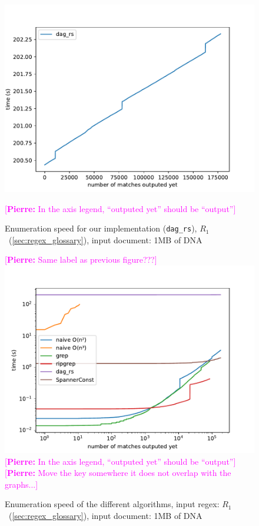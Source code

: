 \documentclass[12px]{article}
\theoremstyle{definition}
\newcommand{\pierre}[1]{\textcolor{magenta}{[\textbf{Pierre:} #1]}}
\begin{document}
      \begin{figure}%
        \caption{
          Enumeration speed for our implementation (\texttt{dag\_rs}),
          $R_1$~(\ref{sec:regex_glossary}), input document: 1MB of DNA }
        \label{fig:bench}
        \center\includegraphics[width=5in]{figures/bench_enum_only}

        \pierre{In the axis legend, ``outputed yet'' should be
        ``output''}
      \end{figure}

      \begin{figure}%
        \caption{
          Enumeration speed of the different algorithms, input regex:
          $R_1$~(\ref{sec:regex_glossary}), input document: 1MB of DNA
        }
        \label{fig:bench} \pierre{Same label as previous figure???}
        \center\includegraphics[width=5in]{figures/bench}
        \pierre{In the axis legend, ``outputed yet'' should be
        ``output''}
        \pierre{Move the key somewhere it does not overlap with the
        graphs...}
      \end{figure}
\end{document}
